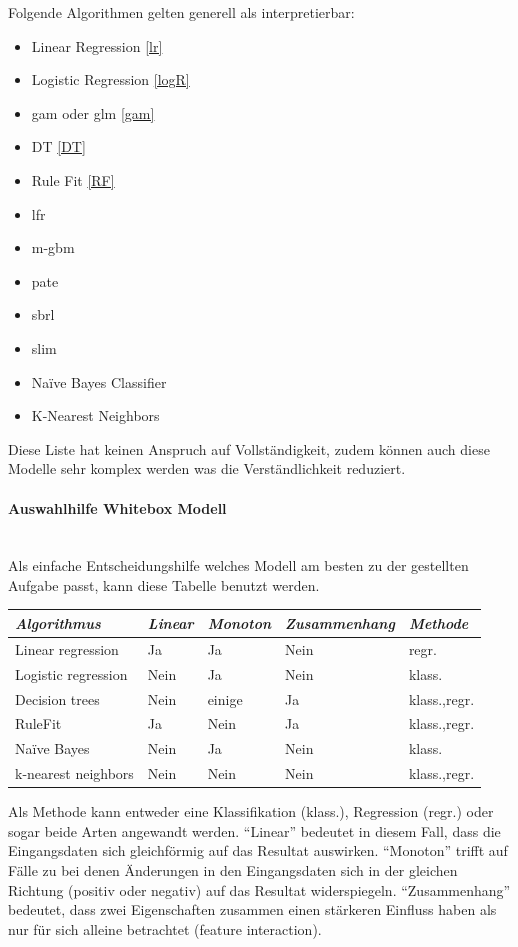 \documentclass[
  12pt, %
  a4paper, %
  oneside, %
  openany, 
  numbers=noenddot, %
  BCOR=5mm, %
  parskip=half*, %
  thesis, %
]{bfhbook}
\newcommand{\parag}[1]{\paragraph*{#1}\mbox{}\\}
\begin{document}
Folgende Algorithmen gelten generell als interpretierbar:
\begin{itemize}
	\item Linear Regression \ref{lr}
	\item Logistic Regression \ref{logR}
	\item \acrfull{gam} oder \acrfull{glm} \ref{gam}
	\item \Gls{DT} \ref{DT}
	\item Rule Fit  \ref{RF}
	\item \acrfull{lfr}
	\item \acrfull{m-gbm}
	\item \acrfull{pate}	
	\item \acrfull{sbrl}
	\item \acrfull{slim}
	\item Naïve Bayes Classifier
	\item K-Nearest Neighbors
\end{itemize}
Diese Liste hat keinen Anspruch auf Vollständigkeit, zudem können auch diese Modelle sehr komplex werden was die Verständlichkeit reduziert.

\parag{Auswahlhilfe Whitebox Modell}
Als einfache Entscheidungshilfe welches Modell am besten zu der gestellten Aufgabe passt, kann diese Tabelle benutzt werden. 

\begin{table}[ht]
\begin{tabular}{@{} *5l @{}}    \toprule
	\emph{Algorithmus} & \emph{Linear} & \emph{Monoton} & \emph{Zusammenhang} & \emph{Methode}  \\\midrule
	Linear regression & Ja & Ja & 	Nein & regr. \\
	Logistic regression & Nein & Ja & 	Nein & klass. \\
	Decision trees & Nein & einige &	Ja & klass.,regr. \\
	RuleFit & Ja & Nein & Ja & 	klass.,regr. \\
	Naïve Bayes	 & Nein & Ja & 	Nein & klass. \\
	k-nearest neighbors & Nein & Nein & Nein & klass.,regr. \\ \bottomrule
	 \hline
\end{tabular}
\end{table}

Als Methode kann entweder eine Klassifikation (klass.), Regression (regr.) oder sogar beide Arten angewandt werden. ``Linear'' bedeutet in diesem Fall, dass die Eingangsdaten sich gleichförmig auf das Resultat auswirken. ``Monoton'' trifft auf Fälle zu bei denen Änderungen in den Eingangsdaten sich in der gleichen Richtung (positiv oder negativ) auf das Resultat widerspiegeln. ``Zusammenhang'' bedeutet, dass zwei Eigenschaften zusammen einen stärkeren Einfluss haben als nur für sich alleine betrachtet (feature interaction).
\end{document}
